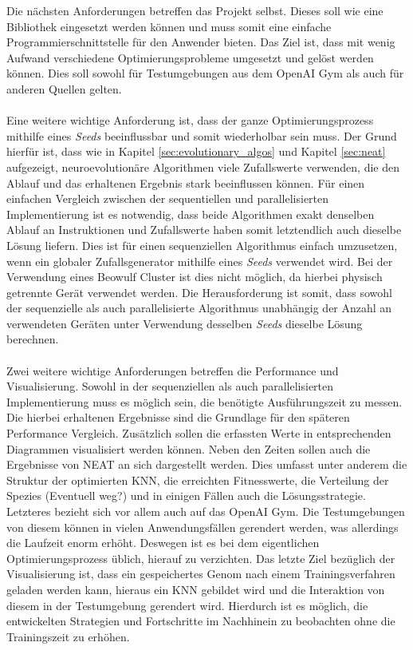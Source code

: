 Die nächsten Anforderungen betreffen das Projekt selbst. Dieses soll wie eine Bibliothek eingesetzt werden können und muss somit eine einfache Programmierschnittstelle für den Anwender bieten. Das Ziel ist, dass mit wenig Aufwand verschiedene Optimierungsprobleme umgesetzt und gelöst werden können. Dies soll sowohl für Testumgebungen aus dem OpenAI Gym als auch für anderen Quellen gelten. 
\\\\ %
Eine weitere wichtige Anforderung ist, dass der ganze Optimierungsprozess mithilfe eines \emph{Seeds} beeinflussbar und somit wiederholbar sein muss. Der Grund hierfür ist, dass wie in Kapitel \ref{sec:evolutionary_algos} und Kapitel \ref{sec:neat} aufgezeigt, neuroevolutionäre Algorithmen viele Zufallswerte verwenden, die den Ablauf und das erhaltenen Ergebnis stark beeinflussen können. Für einen einfachen Vergleich zwischen der sequentiellen und parallelisierten Implementierung ist es notwendig, dass beide Algorithmen exakt denselben Ablauf an Instruktionen und Zufallswerte haben somit letztendlich auch dieselbe Lösung liefern. Dies ist für einen sequenziellen Algorithmus einfach umzusetzen, wenn ein globaler Zufallsgenerator mithilfe eines \emph{Seeds} verwendet wird. Bei der Verwendung eines Beowulf Cluster ist dies nicht möglich, da hierbei physisch getrennte Gerät verwendet werden. Die Herausforderung ist somit, dass sowohl der sequenzielle als auch parallelisierte Algorithmus unabhängig der Anzahl an verwendeten Geräten unter Verwendung desselben \emph{Seeds} dieselbe Lösung berechnen.
\\\\
Zwei weitere wichtige Anforderungen betreffen die Performance und Visualisierung. Sowohl in der sequenziellen als auch parallelisierten Implementierung muss es möglich sein, die benötigte Ausführungszeit zu messen. Die hierbei erhaltenen Ergebnisse sind die Grundlage für den späteren Performance Vergleich. Zusätzlich sollen die erfassten Werte in entsprechenden Diagrammen visualisiert werden können. Neben den Zeiten sollen auch die Ergebnisse von \ac{NEAT} an sich dargestellt werden. Dies umfasst unter anderem die Struktur der optimierten \ac{KNN}, die erreichten Fitnesswerte, die Verteilung der Spezies (Eventuell weg?) und in einigen Fällen auch die Lösungsstrategie. Letzteres bezieht sich vor allem auch auf das OpenAI Gym. Die Testumgebungen von diesem können in vielen Anwendungsfällen gerendert werden, was allerdings die Laufzeit enorm erhöht. Deswegen ist es bei dem eigentlichen Optimierungsprozess üblich, hierauf zu verzichten. Das letzte Ziel bezüglich der Visualisierung ist, dass ein gespeichertes Genom nach einem Trainingsverfahren geladen werden kann, hieraus ein \ac{KNN} gebildet wird und die Interaktion von diesem in der Testumgebung gerendert wird. Hierdurch ist es möglich, die entwickelten Strategien und Fortschritte im Nachhinein zu beobachten ohne die Trainingszeit zu erhöhen.
